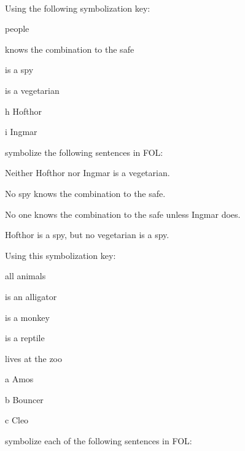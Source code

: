 \

\problempart
\label{pr.FOLvegetarians}
Using the following symbolization key:
\begin{ekey}
\item[\text{domain}] people
\item[\atom{K}{x}]  knows the combination to the safe
\item[\atom{S}{x}]  is a spy
\item[\atom{V}{x}]  is a vegetarian
\item[h] Hofthor
\item[i] Ingmar
\end{ekey}
symbolize the following sentences in FOL:
\begin{compactlist}
\item Neither Hofthor nor Ingmar is a vegetarian.
\item No spy knows the combination to the safe.
\item No one knows the combination to the safe unless Ingmar does.
\item Hofthor is a spy, but no vegetarian is a spy.
\end{compactlist}
\solutions
\problempart\label{pr.FOLalligators}
Using this symbolization key:
\begin{ekey}
\item[\text{domain}] all animals
\item[\atom{A}{x}]  is an alligator
\item[\atom{M}{x}]  is a monkey
\item[\atom{R}{x}]  is a reptile
\item[\atom{Z}{x}]  lives at the zoo
\item[a] Amos
\item[b] Bouncer
\item[c] Cleo
\end{ekey}
symbolize each of the following sentences in FOL:

